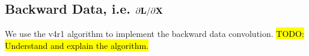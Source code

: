 
    
    


    
    



\subsection{Backward Data, i.e. $\partial \bold{L}/\partial \bold{X}$}
We use the v4r1 algorithm to implement the backward data convolution.
\hl{TODO: Understand and explain the algorithm.}



